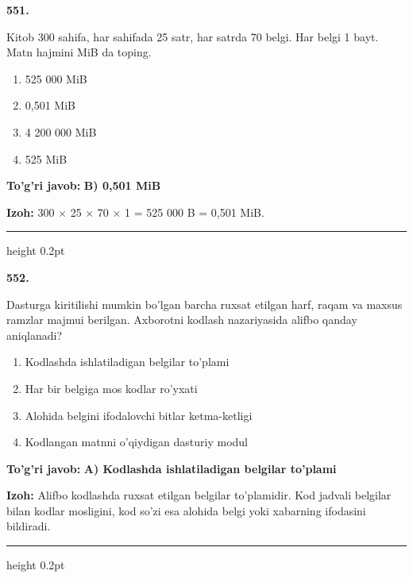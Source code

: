 \documentclass[10pt,a4paper,oneside]{article}
\begin{document}
\noindent\textbf{\color{ink}551.}
\par
Kitob 300 sahifa, har sahifada 25 satr, har satrda 70 belgi. Har belgi 1 bayt. Matn hajmini MiB da toping.
\begin{enumerate}[label=\Alph*),leftmargin=9mm]
\item 525 000 MiB
\item 0,501 MiB
\item 4 200 000 MiB
\item 525 MiB
\end{enumerate}
\begin{tcolorbox}[enhanced,breakable,colback=teal!4,colframe=teal!50!black,boxrule=0.5pt,arc=1.1mm,left=3mm,right=3mm,top=1.7mm,bottom=1.7mm,before skip=2mm,after skip=2mm]
\textbf{\color{teal}To'g'ri javob:} \textbf{B) 0,501 MiB}
\par\smallskip
\textbf{Izoh:} 300 \ensuremath{\times} 25 \ensuremath{\times} 70 \ensuremath{\times} 1 = 525 000 B = 0,501 MiB.
\end{tcolorbox}
\vspace{2mm}\hrule height 0.2pt \vspace{3mm}

\noindent\textbf{\color{ink}552.}
\par
Dasturga kiritilishi mumkin bo'lgan barcha ruxsat etilgan harf, raqam va maxsus ramzlar majmui berilgan. Axborotni kodlash nazariyasida alifbo qanday aniqlanadi?
\begin{enumerate}[label=\Alph*),leftmargin=9mm]
\item Kodlashda ishlatiladigan belgilar to'plami
\item Har bir belgiga mos kodlar ro'yxati
\item Alohida belgini ifodalovchi bitlar ketma-ketligi
\item Kodlangan matnni o'qiydigan dasturiy modul
\end{enumerate}
\begin{tcolorbox}[enhanced,breakable,colback=teal!4,colframe=teal!50!black,boxrule=0.5pt,arc=1.1mm,left=3mm,right=3mm,top=1.7mm,bottom=1.7mm,before skip=2mm,after skip=2mm]
\textbf{\color{teal}To'g'ri javob:} \textbf{A) Kodlashda ishlatiladigan belgilar to'plami}
\par\smallskip
\textbf{Izoh:} Alifbo kodlashda ruxsat etilgan belgilar to'plamidir. Kod jadvali belgilar bilan kodlar mosligini, kod so'zi esa alohida belgi yoki xabarning ifodasini bildiradi.
\end{tcolorbox}
\vspace{2mm}\hrule height 0.2pt \vspace{3mm}
\end{document}
